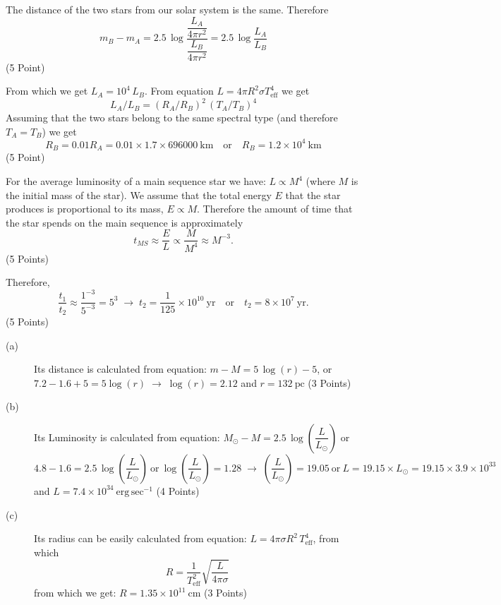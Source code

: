 The distance of the two stars from our solar system is the same. Therefore
\[
  m_B - m_A = 2.5\,\log\frac{\dfrac{L_A}{4\pi r^2}}{\dfrac{L_B}{4\pi r^2}}
            = 2.5\,\log\frac{L_A}{L_B}
\]
\hfill(5 Point)

From which we get $L_A = 10^4\,L_B$. From equation
$L = 4\pi R^2 \sigma T_{\mathrm{eff}}^4$ we get
\[
  L_A/L_B = (R_A/R_B)^2\,(T_A/T_B)^4
\]
Assuming that the two stars belong to the same spectral type (and therefore
$T_A = T_B$) we get
\[
  R_B = 0.01 R_A = 0.01 \times 1.7 \times 696000\ \mathrm{km}
  \quad\text{or}\quad R_B = 1.2\times10^{4}\ \mathrm{km}
\]
\hfill(5 Point)

For the average luminosity of a main sequence star we have: $L \propto M^4$
(where $M$ is the initial mass of the star). We assume that the total energy
$E$ that the star produces is proportional to its mass, $E \propto M$.
Therefore the amount of time that the star spends on the main sequence is
approximately
\[
  t_{MS} \approx \frac{E}{L} \propto \frac{M}{M^4} \approx M^{-3}.
\]
\hfill(5 Points)

Therefore,
\[
  \frac{t_1}{t_2} \approx \frac{1^{-3}}{5^{-3}} = 5^3
  \;\rightarrow\;
  t_2 = \frac{1}{125}\times10^{10}\ \mathrm{yr}
  \quad\text{or}\quad t_2 = 8\times10^{7}\ \mathrm{yr}.
\]
\hfill(5 Points)

\begin{description}
\item[(a)] Its distance is calculated from equation: $m - M = 5\,\log(r) - 5$,
  or $7.2 - 1.6 + 5 = 5\log(r) \;\rightarrow\; \log(r) = 2.12$ and
  $r = 132\ \mathrm{pc}$
  \hfill(3 Points)
\item[(b)] Its Luminosity is calculated from equation:
  $M_\odot - M = 2.5\,\log\!\left(\dfrac{L}{L_\odot}\right)$ or
  \[
    4.8 - 1.6 = 2.5\,\log\!\left(\frac{L}{L_\odot}\right)
    \ \text{or}\
    \log\!\left(\frac{L}{L_\odot}\right) = 1.28
    \;\rightarrow\;
    \left(\frac{L}{L_\odot}\right) = 19.05
    \ \text{or}\
    L = 19.15\times L_\odot %
    = 19.15\times3.9\times10^{33}
  \]
  and $L = 7.4\times10^{34}\ \mathrm{erg\,sec^{-1}}$
  \hfill(4 Points)
\item[(c)] Its radius can be easily calculated from equation:
  $L = 4\pi\sigma R^2\,T_{\mathrm{eff}}^4$, from which
  \[
    R = \frac{1}{T_{\mathrm{eff}}^2}\sqrt{\frac{L}{4\pi\sigma}}
  \]
  from which we get: $R = 1.35\times10^{11}\ \mathrm{cm}$
  \hfill(3 Points)
\end{description}


